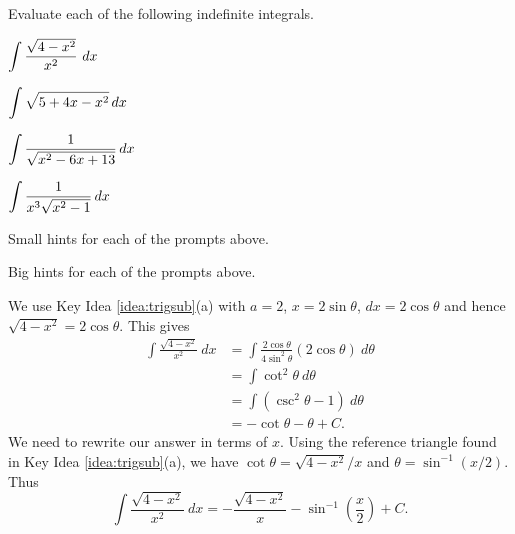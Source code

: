 \begin{activity} \label{A:5.3.1}  Evaluate each of the following indefinite integrals.  
\bmtwo\ba
	\item $\ds \int \frac{\sqrt{4-x^2}}{x^2}\ dx$
	\item $\displaystyle \int \sqrt{5+4x-x^2} \, dx$
	\item $\displaystyle \int \frac{1}{\sqrt{x^2-6x+13}} \, dx$
	\item $\displaystyle \int \frac{1}{x^3\sqrt{x^2-1}}\, dx$
\ea\emtwo
\end{activity}
\begin{smallhint}
\ba
	\item Small hints for each of the prompts above.
\ea
\end{smallhint}
\begin{bighint}
\ba
	\item Big hints for each of the prompts above.
\ea
\end{bighint}
\begin{activitySolution}
\ba
	\item We use Key Idea \ref{idea:trigsub}(a) with $a=2$, $x=2\sin \theta$, $dx = 2\cos \theta$ and hence $\sqrt{4-x^2} = 2\cos\theta$. This gives
\begin{align*}
\int \frac{\sqrt{4-x^2}}{x^2}\ dx &= \int \frac{2\cos\theta}{4\sin^2\theta}(2\cos\theta)\ d\theta\\
		&= \int \cot^2\theta\ d\theta\\
		&=	\int (\csc^2\theta -1)\ d\theta\\
		&= -\cot\theta -\theta + C.
\end{align*}
We need to rewrite our answer in terms of $x$. Using the reference triangle found in Key Idea \ref{idea:trigsub}(a), we have $\cot\theta = \sqrt{4-x^2}/x$ and $\theta = \sin^{-1}(x/2)$. Thus
$$\int \frac{\sqrt{4-x^2}}{x^2}\ dx = -\frac{\sqrt{4-x^2}}x-\sin^{-1}\left(\frac x2\right) + C.$$
	\item 

\ea
\end{activitySolution}
\aftera